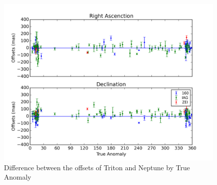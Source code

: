 \documentclass[12pt,a4paper]{report}
\begin{document}
\begin{figure}[H]
\includegraphics[width=14.0cm]{Anom_TN.png} 
\caption{Difference between the offsets of Triton and Neptune by True Anomaly}
\label{Fig:triton-netuno-anom}
\end{figure}
\end{document}
